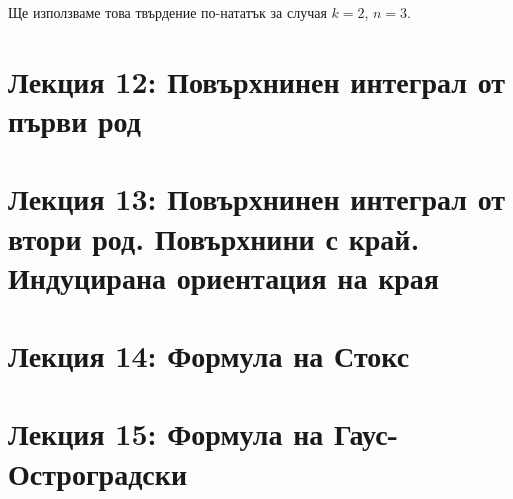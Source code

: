 \documentclass[11pt]{article}
\numberwithin{equation}{section}
\numberwithin{figure}{section}
\numberwithin{table}{section}
\theoremstyle{plain}
\theoremstyle{definition}
\theoremstyle{remark}
\theoremstyle{definition}
\theoremstyle{remark}
\theoremstyle{plain}
\theoremstyle{definition}
\theoremstyle{definition}
\theoremstyle{plain}
\theoremstyle{plain}
\theoremstyle{plain}
\theoremstyle{definition}
\theoremstyle{plain}
\begin{document}
 Ще използваме това твърдение по-нататък за случая $k=2$, $n=3$.

\newpage

\section{Лекция 12: Повърхнинен интеграл от първи род}

\section{Лекция 13: Повърхнинен интеграл от втори род. Повърхнини с край. Индуцирана ориентация на края}

\section{Лекция 14: Формула на Стокс}

\section{Лекция 15: Формула на Гаус-Остроградски}
\end{document}
